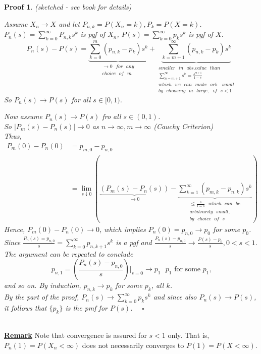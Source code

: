 \documentclass[12pt]{article}
\theoremstyle{definition}
\theoremstyle{plain}
\newtheorem*{myproof}{Proof}
\begin{document}
\begin{myproof}
(sketched - see book for details)


Assume $X_n \rightarrow X$ and let $P_{n,k} = P(X_n = k), P_k = P(X=k)$. 
$P_n(s)= \sum_{k=0}^\infty P_{n,k}s^k$ is pgf of $X_n$, $P(s)  = \sum_{k = 0}^\infty p_k s^k$ is pgf of $X$.
\[
	P_n(s) - P(s) = \underbrace{\sum_{k = 0}^m (p_{n,k} - p_k)s^k}_{\substack{\rightarrow 0\mbox{ } for\mbox{ } any\\ choice\mbox{ } of\mbox{ } m}} + \underbrace{\sum_{k = m+1}^\infty (p_{n,k} - p_k)s^k}_{\substack{smaller\mbox{ } in\mbox{ } abs.value \mbox{ } than \\ \sum_{n = m+1}^\infty s^k = \frac{s^{m+1}}{1-s} \\ which\mbox{ }we\mbox{ }can\mbox{ }make\mbox{ }arb.\mbox{ } small\\by\mbox{ }choosing\mbox{ }m\mbox{ }large,\mbox{ }if\mbox{ }s < 1}}
\] So $P_n(s) \rightarrow P(s)$ for all $s \in [0,1)$. 


Now assume $P_n(s) \rightarrow P(s)$ fro all $s \in (0,1)$. \\
So $|P_m(s) - P_n(s)| \rightarrow 0$ as $n \rightarrow \infty, m \rightarrow \infty$ (Cauchy Criterion)\\
Thus, 
\begin{displaymath}
\begin{aligned}
P_m(0) - P_n(0) &= p_{m,0} - p_{n,0} \\
			&= \lim_{s \downarrow 0}(\underbrace{(P_m(s) - P_n(s))}_{\rightarrow 0}-\underbrace{\sum_{k=1}^\infty (p_{m,k} - p_{n,k})s^k}_{\substack{\leq \frac{s}{1-s} \mbox{ } which \mbox{ }can \mbox{ }be \\ arbitrarily \mbox{ } small,\\ by \mbox{ } choice \mbox{ }of\mbox{ } s}})
\end{aligned}
\end{displaymath}
Hence, $P_m(0) - P_n(0) \rightarrow 0$, which implies $P_n(0)  = p_{n,0} \rightarrow p_0$ for some $p_0$. \\
Since $\frac{P_n(s) = p_{n,0}}{s} = \sum_{k = 0}^\infty p_{n, k+1}s^k$ is a pgf and $\frac{P_n(s) -p_{n,0}}{s} \rightarrow \frac{P(s) - p_0}{s}, 0 < s < 1$. \\
The argument can be repeated to conclude \[p_{n,1} = (\frac{P_n(s) - p_{n,0}}{s})|
_{s=0} \rightarrow p_1 \mbox{ $p_1$ for some $p_1$,}\] and so on. By induction, $p_{n,k} \rightarrow p_k$ for some $p_k$, all $k$. \\
By the  part of the proof, $P_n(s) \rightarrow \sum_{k = 0}^\infty p_k s^k$ and since also $P_n(s) \rightarrow P(s)$, it follows that $\{p_k\}$ is the pmf for $P(s)$. $\quad \square$
\end{myproof}
$\mbox{}$\\
\underline{\textbf{Remark}} Note that convergence is assured for $s < 1$ only. That is, $P_n(1) = P(X_n < \infty)$ does not necessarily converges to $P(1) = P(X < \infty)$. 
\end{document}
